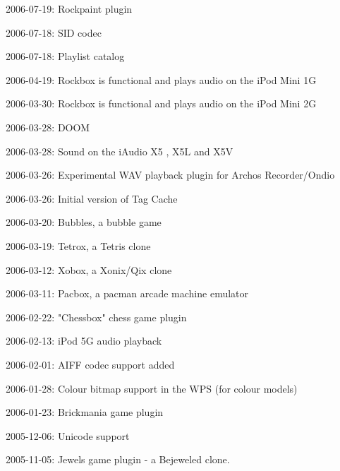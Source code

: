 \begin{changelog}
\item 2006-07-19: Rockpaint plugin
\item 2006-07-18: SID codec
\item 2006-07-18: Playlist catalog
\item 2006-04-19: Rockbox is functional and plays audio on the iPod Mini 1G
\item 2006-03-30: Rockbox is functional and plays audio on the iPod Mini 2G
\item 2006-03-28: DOOM
\item 2006-03-28: Sound on the iAudio X5 , X5L and X5V
\item 2006-03-26: Experimental WAV playback plugin for Archos Recorder/Ondio
\item 2006-03-26: Initial version of Tag Cache
\item 2006-03-20: Bubbles, a bubble game
\item 2006-03-19: Tetrox, a Tetris clone
\item 2006-03-12: Xobox, a Xonix/Qix clone
\item 2006-03-11: Pacbox, a pacman arcade machine emulator
\item 2006-02-22: "Chessbox" chess game plugin
\item 2006-02-13: iPod 5G audio playback
\item 2006-02-01: AIFF codec support added
\item 2006-01-28: Colour bitmap support in the WPS (for colour models)
\item 2006-01-23: Brickmania game plugin
\item 2005-12-06: Unicode support
\item 2005-11-05: Jewels game plugin - a Bejeweled clone.
\end{changelog}

